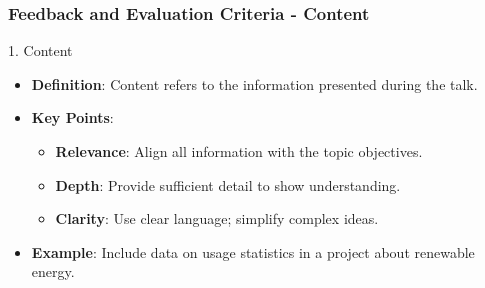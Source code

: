 \documentclass[aspectratio=169]{beamer}
\begin{document}
\begin{frame}[fragile]
    \frametitle{Feedback and Evaluation Criteria - Content}
    \begin{block}{1. Content}
        \begin{itemize}
            \item \textbf{Definition}: Content refers to the information presented during the talk.
            \item \textbf{Key Points}:
            \begin{itemize}
                \item \textbf{Relevance}: Align all information with the topic objectives.
                \item \textbf{Depth}: Provide sufficient detail to show understanding.
                \item \textbf{Clarity}: Use clear language; simplify complex ideas.
            \end{itemize}
            \item \textbf{Example}: Include data on usage statistics in a project about renewable energy.
        \end{itemize}
    \end{block}
\end{frame}
\end{document}

